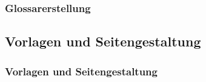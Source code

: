 \begin{frame}
  \frametitle{Glossarerstellung}
  
\end{frame}

\subsection{Vorlagen und Seitengestaltung}
\begin{frame}
  \frametitle{Vorlagen und Seitengestaltung}
  
\end{frame}
